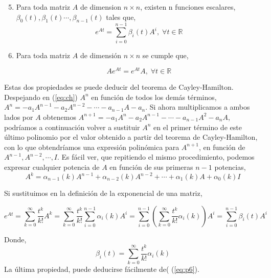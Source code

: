 \begin{enumerate}
\setcounter{enumi}{4}
\item Para toda matriz $A$  de dimension $n\times n$, existen n funciones escalares, $\beta_0(t),\beta_1(t)\cdots,\beta_{n-1}(t)$ tales que,
\begin{equation}\label{eq:p6}
e^{At} = \sum_{i=0}^{n-1} \beta_i(t)A^i,\; \forall t\in \mathbb{R}
\end{equation}
\item  Para toda matriz $A$ de dimensión $n\times n$ se cumple que,

\begin{equation}
Ae^{At}=e^{At}A,\; \forall t \in \mathbb{R}
\end{equation}
\end{enumerate}
Estas dos propiedades se puede deducir del teorema de Cayley-Hamilton. Despejando en (\ref{eq:ch}) $A^n$ en función de todos los demás términos,
$A^n = - a_1A^{n-1}-a_2A^{n-2}- \cdots - a_{n-1}A - a_n$. Si ahora multiplicamos a ambos lados por $A$ obtenemos $A^{n+1} = - a_1A^{n}-a_2A^{n-1}- \cdots - a_{n-1}A^2 - a_nA$, podríamos a continuación volver a sustituir $A^n$ en el primer término de este último polinomio por el valor obtenido a partir del teorema de Cayley-Hamilton, con lo que obtendríamos una expresión polinómica para $A^{n+1}$, en función de $A^{n-1},A^{n-2}, \cdots,I$. Es fácil ver, que repitiendo el mismo procedimiento, podemos expresar cualquier potencia de $A$ en función de sus primeras $n-1$ potencias,
\begin{equation}
A^k  = \alpha_{n-1}(k)A^{n-1}+\alpha_{n-2}(k)A^{n-2}+ \cdots + \alpha_{1}(k)A + \alpha_0(k)I 
\end{equation}

Si sustituimos en la definición de la exponencial de una matriz,

\begin{equation*}
e^{At}=\sum_{k=0}^{\infty} \frac{t^k}{k!}A^k = \sum_{k=0}^{\infty} \frac{t^k}{k!}\sum_{i=0}^{n-1} \alpha_i(k) A^i =\sum_{i=0}^{n-1}\left(  \sum_{k=0}^{\infty}   \frac{t^k}{k!}\alpha_i(k)\right) A^i =\sum_{i=0}^{n-1} \beta_i(t)A^i
\end{equation*}

Donde, 
\begin{equation*}
\beta_i(t) = \sum_{k=0}^{\infty}   \frac{t^k}{k!}\alpha_i(k)
\end{equation*}
La última propiedad, puede deducirse fácilmente de( (\ref{eq:p6}).

